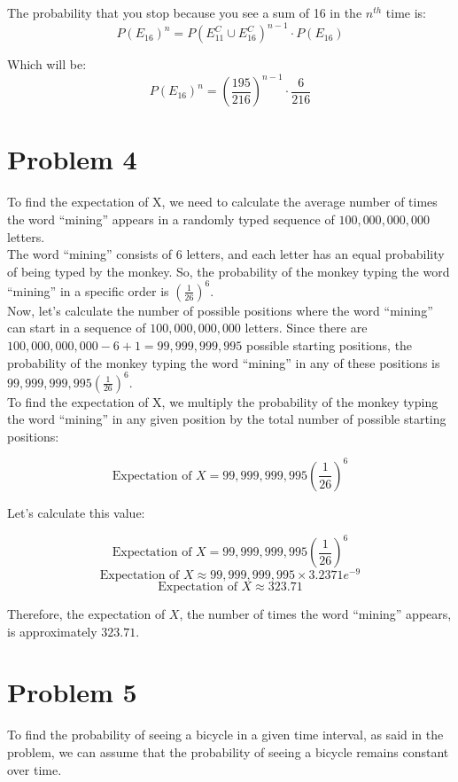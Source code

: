 	The probability that you stop because you see a sum of 16 in the $ n^{th} $ time is:
	\[
	P(E_{16})^{n} = P(E_{11}^{C} \cup E_{16}^{C})^{n-1} \cdot P(E_{16})
	\]
	
	Which will be:
	\[
	P(E_{16})^{n} = (\frac{195}{216})^{n-1} \cdot \frac{6}{216}
	\]

	\newpage
	\section*{Problem 4}\label{sec:prob-4}
	To find the expectation of X, we need to calculate the average number of times the word ``mining'' appears in a randomly typed sequence of $100,000,000,000$ letters.\\
	
	The word ``mining'' consists of $6$ letters, and each letter has an equal probability of being typed by the monkey. So, the probability of the monkey typing the word ``mining'' in a specific order is $\left(\frac{1}{26}\right)^6$.\\
	
	Now, let's calculate the number of possible positions where the word ``mining'' can start in a sequence of $100,000,000,000$ letters. Since there are $100,000,000,000 - 6 + 1 = 99,999,999,995$ possible starting positions, the probability of the monkey typing the word ``mining'' in any of these positions is $99,999,999,995 \left(\frac{1}{26}\right)^6$.\\
	
	To find the expectation of X, we multiply the probability of the monkey typing the word ``mining'' in any given position by the total number of possible starting positions:
	
	\[
	\text{Expectation of } X = 99,999,999,995 \left(\frac{1}{26}\right)^6
	\]
	
	Let's calculate this value:
	
	\[
	\text{Expectation of } X = 99,999,999,995 \left(\frac{1}{26}\right)^6
	\]
	\[
	\text{Expectation of } X \approx 99,999,999,995 \times 3.2371e^{-9}
	\]
	\[
	\text{Expectation of } X \approx 323.71
	\]
	
	Therefore, the expectation of $X$, the number of times the word ``mining'' appears, is approximately $323.71$.
	
	\newpage
	\section*{Problem 5}\label{sec:prob-5}
	To find the probability of seeing a bicycle in a given time interval, as said in the problem, we can assume that the probability of seeing a bicycle remains constant over time. 
	
